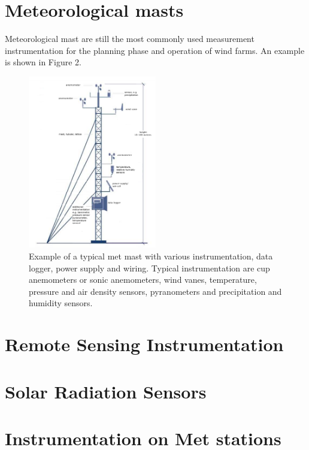 \section{Meteorological masts} \label{subsec:meteorological_masts}

Meteorological mast are still the most commonly used measurement instrumentation for the planning phase and operation of wind farms. An example is shown in Figure 2. 


\begin{figure}[h!]
\center
\includegraphics[width=0.5\textwidth]{figures/typical_met_mast.png}
\caption{Example of a typical met mast with various instrumentation, data logger, power supply and wiring. Typical instrumentation are cup anemometers or sonic anemometers, wind vanes, temperature, pressure and air density sensors, pyranometers and precipitation and humidity  sensors.}
\label{fig:met_mast}
\end{figure}






\section{Remote Sensing Instrumentation {\color{magenta}{Contributing author: ES}}}\label{sec:remote-sensing}




\section{Solar Radiation Sensors }\label{sec:solarradiation}


\section{Instrumentation on Met stations }\label{sec:metstations}


